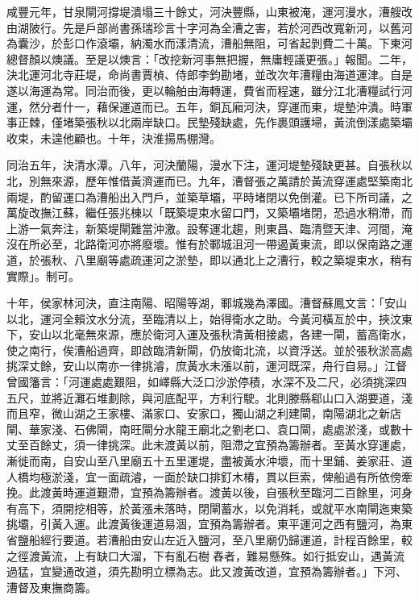 \begin{pinyinscope}
咸豐元年，甘泉閘河撐堤潰塌三十餘丈，河決豐縣，山東被淹，運河漫水，漕艘改由湖陂行。先是戶部尚書孫瑞珍言十字河為全漕之害，若於河西改寬新河，以舊河為囊沙，於彭口作滾壩，納濁水而漾清流，漕船無阻，可省起剝費二十萬。下東河總督顏以燠議。至是以燠言：「改挖新河事無把握，無庸輕議更張。」報聞。二年，決北運河北寺莊堤，命尚書賈楨、侍郎李鈞勘堵，並改次年漕糧由海道運津。自是遂以海運為常。同治而後，更以輪舶由海轉運，費省而程速，雖分江北漕糧試行河運，然分者什一，藉保運道而已。五年，銅瓦廂河決，穿運而東，堤墊沖潰。時軍事正棘，僅堵築張秋以北兩岸缺口。民墊殘缺處，先作裹頭護埽，黃流倒漾處築壩收束，未遑他顧也。十年，決淮揚馬棚灣。

同治五年，決清水潭。八年，河決蘭陽，漫水下注，運河堤墊殘缺更甚。自張秋以北，別無來源，歷年惟借黃濟運而已。九年，漕督張之萬請於黃流穿運處堅築南北兩堤，酌留運口為漕船出入門戶，並築草壩，平時堵閉以免倒灌。已下所司議，之萬旋改撫江蘇，繼任張兆棟以「既築堤束水留口門，又築壩堵閉，恐過水稍滯，而上游一氣奔注，新築堤閘難當沖激。設奪運北趨，則東昌、臨清暨天津、河間，淹沒在所必至，北路衛河亦將廢壞。惟有於鄆城沮河一帶遏黃東流，即以保南路之運道，於張秋、八里廟等處疏運河之淤墊，即以通北上之漕行，較之築堤束水，稍有實際」。制可。

十年，侯家林河決，直注南陽、昭陽等湖，鄆城幾為澤國。漕督蘇鳳文言：「安山以北，運河全賴汶水分流，至臨清以上，始得衛水之助。今黃河橫亙於中，挾汶東下，安山以北毫無來源，應於衛河入運及張秋清黃相接處，各建一閘，蓄高衛水，使之南行，俟漕船過齊，即啟臨清新閘，仍放衛北流，以資浮送。並於張秋淤高處挑深丈餘，安山以南亦一律挑濬，庶黃水未漲以前，運河既深，舟行自易。」江督曾國籓言：「河運處處艱阻，如嶧縣大泛口沙淤停積，水深不及二尺，必須挑深四五尺，並將近灘石堆劃除，與河底配平，方利行駛。北則滕縣郗山口入湖要道，淺而且窄，微山湖之王家樓、滿家口、安家口，獨山湖之利建閘，南陽湖北之新店閘、華家淺、石佛閘，南旺閘分水龍王廟北之劉老口、袁口閘，處處淤淺，或數十丈至百餘丈，須一律挑深。此未渡黃以前，阻滯之宜預為籌辦者。至黃水穿運處，漸徙而南，自安山至八里廟五十五里運堤，盡被黃水沖壞，而十里鋪、姜家莊、道人橋均極淤淺，宜一面疏濬，一面於缺口排釘木椿，貫以巨索，俾船過有所依傍牽挽。此渡黃時運道艱滯，宜預為籌辦者。渡黃以後，自張秋至臨河二百餘里，河身有高下，須開挖相等，於黃漲未落時，閉閘蓄水，以免消耗，或就平水南閘迤東築挑壩，引黃入運。此渡黃後運道易涸，宜預為籌辦者。東平運河之西有鹽河，為東省鹽船經行要道。若漕船由安山左近入鹽河，至八里廟仍歸運道，計程百餘里，較之徑渡黃流，上有缺口大溜，下有亂石樹舂者，難易懸殊。如行抵安山，遇黃流過猛，宜變通改道，須先勘明立標為志。此又渡黃改道，宜預為籌辦者。」下河、漕督及東撫商籌。


\end{pinyinscope}
